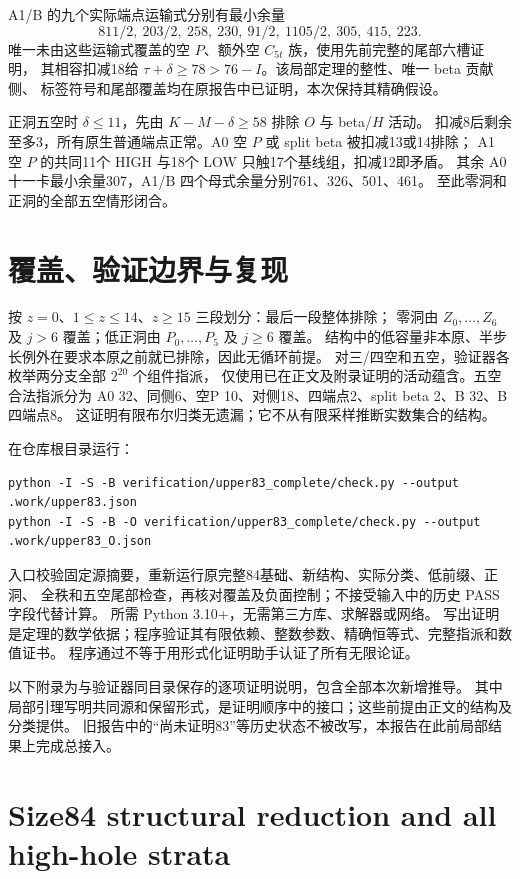 \documentclass[11pt,a4paper]{article}
\begin{document}
A1/B 的九个实际端点运输式分别有最小余量
\[
 811/2,\ 203/2,\ 258,\ 230,\ 91/2,\ 1105/2,\ 305,\ 415,\ 223.
\]
唯一未由这些运输式覆盖的空 $P$、额外空 $C_{5t}$ 族，使用先前完整的尾部六槽证明，
其相容扣减18给 $\tau+\delta\ge78>76-I$。该局部定理的整性、唯一 beta 贡献侧、
标签符号和尾部覆盖均在原报告中已证明，本次保持其精确假设。

正洞五空时 $\delta\le11$，先由 $K-M-\delta\ge58$ 排除 $O$ 与 beta/$H$ 活动。
扣减8后剩余至多3，所有原生普通端点正常。A0 空 $P$ 或 split beta 被扣减13或14排除；
A1 空 $P$ 的共同11个 HIGH 与18个 LOW 只触17个基线组，扣减12即矛盾。
其余 A0 十一卡最小余量307，A1/B 四个母式余量分别761、326、501、461。
至此零洞和正洞的全部五空情形闭合。

\section{覆盖、验证边界与复现}
按 $z=0$、$1\le z\le14$、$z\ge15$ 三段划分：最后一段整体排除；
零洞由 $Z_0,\ldots,Z_6$ 及 $j>6$ 覆盖；低正洞由 $P_0,\ldots,P_5$ 及 $j\ge6$ 覆盖。
结构中的低容量非本原、半步长例外在要求本原之前就已排除，因此无循环前提。
对三/四空和五空，验证器各枚举两分支全部 $2^{20}$ 个组件指派，
仅使用已在正文及附录证明的活动蕴含。五空合法指派分为
A0 32、同侧6、空P 10、对侧18、四端点2、split beta 2、B 32、B四端点8。
这证明有限布尔归类无遗漏；它不从有限采样推断实数集合的结构。

在仓库根目录运行：
\begin{verbatim}
python -I -S -B verification/upper83_complete/check.py --output .work/upper83.json
python -I -S -B -O verification/upper83_complete/check.py --output .work/upper83_O.json
\end{verbatim}
入口校验固定源摘要，重新运行原完整84基础、新结构、实际分类、低前缀、正洞、
全秩和五空尾部检查，再核对覆盖及负面控制；不接受输入中的历史 PASS 字段代替计算。
所需 Python 3.10+，无需第三方库、求解器或网络。
写出证明是定理的数学依据；程序验证其有限依赖、整数参数、精确恒等式、完整指派和数值证书。
程序通过不等于用形式化证明助手认证了所有无限论证。

以下附录为与验证器同目录保存的逐项证明说明，包含全部本次新增推导。
其中局部引理写明共同源和保留形式，是证明顺序中的接口；这些前提由正文的结构及分类提供。
旧报告中的“尚未证明83”等历史状态不被改写，本报告在此前局部结果上完成总接入。
\appendix
\clearpage
\hypertarget{size84-structural-reduction-and-all-high-hole-strata}{%
\section{Size84 structural reduction and all high-hole
strata}\label{size84-structural-reduction-and-all-high-hole-strata}}
\end{document}
